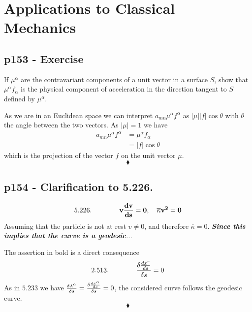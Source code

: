 \setcounter{chapter}{4}
\chapter{Applications to Classical Mechanics}
\pagebreak[4]
\section{p153 - Exercise}
\begin{tcolorbox}
If $\mu^{\alpha}$ are the contravariant components of a unit vector in a surface $S$, show that $\mu^{\alpha}f_{\alpha}$ is the physical component of acceleration in the direction tangent to $S$ defined by $\mu^{\alpha}$.
\end{tcolorbox}
As we are in an Euclidean space we can interpret $a_{mn}\mu^{\alpha}f^{\alpha}$ as $\left|\mu\right|\left|f\right|\cos\theta $ with $\theta$ the angle between the two vectors. As $\left|\mu\right|=1$ we have
\begin{align}
a_{mn}\mu^{\alpha}f^{\alpha}&= \mu^{\alpha}f_{\alpha}\\
&= \left|f\right|\cos\theta 
\end{align}
which is the projection of the vector $f$ on the unit vector $\mu$.
$$\blacklozenge$$
\newpage

\section{p154 - Clarification to 5.226.}
\begin{tcolorbox}
$$\mathbf{\text{5.226.}\quad\quad\quad\quad v\dv{v}{s}=0,\quad \overline{\kappa}v^2=0}$$
Assuming that the particle is not at rest $v\ne 0$, and therefore $\overline{\kappa}=0$. \textit{\textbf{Since this implies that the curve is a geodesic}...}
\end{tcolorbox}
The assertion in bold is a direct consequence $$\mathbf{\text{2.513.}}\quad\quad\quad\quad \frac{\delta \dv{x^r}{s}}{\delta s}=0$$ 
As in $ \mathbf{5.233}$ we have $\frac{\delta \lambda^{\alpha}}{\delta s}=\frac{\delta \dv{x^{\alpha}}{s}}{\delta s}=0$, the considered curve follows the geodesic curve.
$$\blacklozenge$$
\newpage


